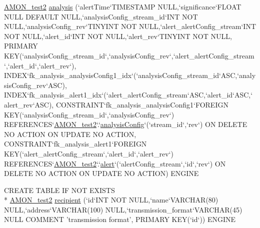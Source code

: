 \begin{DoxyCompactItemize}
\hyperlink{db__mc__build_8sql_a19c21c59303d8b6591b92240ff7de1d5}{A\-M\-O\-N\-\_\-test2} \hyperlink{db__mc__build_8sql_aa58c5a0f4948ad11fd4eaaba444e9e22}{analysis} (`alert\-Time`T\-I\-M\-E\-S\-T\-A\-M\-P N\-U\-L\-L,`significance`F\-L\-O\-A\-T N\-U\-L\-L D\-E\-F\-A\-U\-L\-T N\-U\-L\-L,`analysis\-Config\-\_\-stream\-\_\-id`I\-N\-T N\-O\-T N\-U\-L\-L,`analysis\-Config\-\_\-rev`T\-I\-N\-Y\-I\-N\-T N\-O\-T N\-U\-L\-L,`alert\-\_\-alert\-Config\-\_\-stream`I\-N\-T N\-O\-T N\-U\-L\-L,`alert\-\_\-id`I\-N\-T N\-O\-T N\-U\-L\-L,`alert\-\_\-rev`T\-I\-N\-Y\-I\-N\-T N\-O\-T N\-U\-L\-L, P\-R\-I\-M\-A\-R\-Y K\-E\-Y(`analysis\-Config\-\_\-stream\-\_\-id`,`analysis\-Config\-\_\-rev`,`alert\-\_\-alert\-Config\-\_\-stream`,`alert\-\_\-id`,`alert\-\_\-rev`), I\-N\-D\-E\-X`fk\-\_\-analysis\-\_\-analysis\-Config1\-\_\-idx`(`analysis\-Config\-\_\-stream\-\_\-id`A\-S\-C,`analysis\-Config\-\_\-rev`A\-S\-C), I\-N\-D\-E\-X`fk\-\_\-analysis\-\_\-alert1\-\_\-idx`(`alert\-\_\-alert\-Config\-\_\-stream`A\-S\-C,`alert\-\_\-id`A\-S\-C,`alert\-\_\-rev`A\-S\-C), C\-O\-N\-S\-T\-R\-A\-I\-N\-T`fk\-\_\-analysis\-\_\-analysis\-Config1`F\-O\-R\-E\-I\-G\-N K\-E\-Y(`analysis\-Config\-\_\-stream\-\_\-id`,`analysis\-Config\-\_\-rev`) R\-E\-F\-E\-R\-E\-N\-C\-E\-S`\hyperlink{db__mc__build_8sql_a19c21c59303d8b6591b92240ff7de1d5}{A\-M\-O\-N\-\_\-test2}`.`\hyperlink{db__mc__build_8sql_a4a9f4a95bbb46957f7f01b91207e74ae}{analysis\-Config}`(`stream\-\_\-id`,`rev`) O\-N D\-E\-L\-E\-T\-E N\-O A\-C\-T\-I\-O\-N O\-N U\-P\-D\-A\-T\-E N\-O A\-C\-T\-I\-O\-N, C\-O\-N\-S\-T\-R\-A\-I\-N\-T`fk\-\_\-analysis\-\_\-alert1`F\-O\-R\-E\-I\-G\-N K\-E\-Y(`alert\-\_\-alert\-Config\-\_\-stream`,`alert\-\_\-id`,`alert\-\_\-rev`) R\-E\-F\-E\-R\-E\-N\-C\-E\-S`\hyperlink{db__mc__build_8sql_a19c21c59303d8b6591b92240ff7de1d5}{A\-M\-O\-N\-\_\-test2}`.`\hyperlink{db__mc__build_8sql_a38a604686c7d372f50752e893e3e1e21}{alert}`(`alert\-Config\-\_\-stream`,`id`,`rev`) O\-N D\-E\-L\-E\-T\-E N\-O A\-C\-T\-I\-O\-N O\-N U\-P\-D\-A\-T\-E N\-O A\-C\-T\-I\-O\-N) E\-N\-G\-I\-N\-E
\item 
C\-R\-E\-A\-T\-E T\-A\-B\-L\-E I\-F N\-O\-T E\-X\-I\-S\-T\-S \\*
\hyperlink{db__mc__build_8sql_a19c21c59303d8b6591b92240ff7de1d5}{A\-M\-O\-N\-\_\-test2} \hyperlink{db__mc__build_8sql_a3422288d8b436fcb8603925e692b2aa2}{recipient} (`id`I\-N\-T N\-O\-T N\-U\-L\-L,`name`V\-A\-R\-C\-H\-A\-R(80) N\-U\-L\-L,`address`V\-A\-R\-C\-H\-A\-R(100) N\-U\-L\-L,`transmission\-\_\-format`V\-A\-R\-C\-H\-A\-R(45) N\-U\-L\-L C\-O\-M\-M\-E\-N\-T 'transmission format', P\-R\-I\-M\-A\-R\-Y K\-E\-Y(`id`)) E\-N\-G\-I\-N\-E

\end{DoxyCompactItemize}
